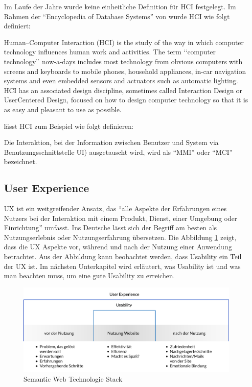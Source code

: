 \noindent Im Laufe der Jahre wurde keine einheitliche Definition für \ac{HCI} festgelegt.
Im Rahmen der \enquote{Encyclopedia of Database Systems} von \citet{dix_human-computer_2009} wurde \ac{HCI} wie folgt definiert:
\begin{definition}
  Human–Computer Interaction (HCI) is the study of the way in which computer technology influences human work and activities. 
  The term ‘‘computer technology’’ now-a-days includes most technology from obvious computers with screens and keyboards to mobile phones, household appliances, in-car navigation
  systems and even embedded sensors and actuators such as automatic lighting. 
  HCI has an associated design discipline, sometimes called Interaction Design or UserCentered Design, focused on how to design computer technology so that it is as easy and
  pleasant to use as possible.
\end{definition}

\noindent \citet{heimgartner_interkulturelles_2017} lässt \ac{HCI} zum Beispiel wie folgt definieren:

\begin{definition}
  Die Interaktion, bei der Information zwischen Benutzer und System via Benutzungsschnittstelle \ac{UI}) ausgetauscht wird, wird als \enquote{\ac{MMI}}  oder  \enquote{\ac{MCI}} 		 bezeichnet.
\end{definition}

\subsection{User Experience}

 \ac{UX} ist ein weitgreifender Ansatz, das \enquote{alle Aspekte der Erfahrungen eines Nutzers bei der Interaktion mit einem Produkt, Dienst, einer Umgebung oder Einrichtung} umfasst.
Ins Deutsche lässt sich der Begriff am besten als Nutzungserlebnis oder Nutzungserfahrung übersetzen. \citep[vgl.]{jacobsen_praxisbuch_2019}
Die Abbildung \ref{fig:abb2} zeigt, dass die \ac{UX} Aspekte vor, während und nach der Nutzung einer Anwendung betrachtet.
Aus der Abbildung kann beobachtet werden, dass Usability ein Teil der \ac{UX} ist.
Im nächsten Unterkapitel wird erläutert, was Usability ist und was man beachten muss, um eine gute Usability zu erreichen.

\begin{figure}[h]
	\centering
    	\includegraphics[width=0.99\textwidth]{Images/User_Experience.png}
   	\caption{Semantic Web Technologie Stack}
   	\label{fig:abb2}
\end{figure}

